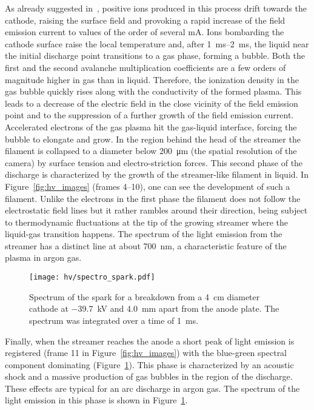 As already suggested in~\cite{breakdown_14}, positive ions produced in this process drift towards the cathode, raising the surface field and provoking a rapid increase of the field emission current to values of the order of several \si{\milli\ampere}.
Ions bombarding the cathode surface raise the local temperature and, after \SIrange{1}{2}{\milli\second}, the liquid near the initial discharge point transitions to a gas phase, forming a bubble.
Both the first and the second avalanche multiplication coefficients are a few orders of magnitude higher in gas than in liquid.
Therefore, the ionization density in the gas bubble quickly rises along with the conductivity of the formed plasma.
This leads to a decrease of the electric field in the close vicinity of the field emission point and to the suppression of a further growth of the field emission current.
Accelerated electrons of the gas plasma hit the gas-liquid interface, forcing the bubble to elongate and grow.
In the region behind the head of the streamer the filament is collapsed to a diameter below \SI{200}{\micro\metre} (the spatial resolution of the camera) by surface tension and electro-striction forces.
This second phase of the discharge is characterized by the growth of the streamer-like filament in liquid.
In Figure~\ref{fig:hv_images} (frames \numrange{4}{10}), one can see the development of such a filament.
Unlike the electrons in the first phase the filament does not follow the electrostatic field lines but it rather rambles around their direction, being subject to thermodynamic fluctuations at the tip of the growing streamer where the liquid-gas transition happens.
The spectrum of the light emission from the streamer has a distinct line at about \SI{700}{\nano\metre}, a characteristic feature of the plasma in argon gas.

\begin{figure}[htb]
	\centering
	\texttt{[image: hv/spectro\_spark.pdf]}
	\caption{Spectrum of the spark for a breakdown from a \SI{4}{\centi\metre} diameter cathode at \SI{-39.7}{\kilo\volt} and \SI{4.0}{\milli\metre} apart from the anode plate. The spectrum was integrated over a time of \SI{1}{\milli\second}.}
	\label{fig:hv_spectro_spark}
\end{figure}

Finally, when the streamer reaches the anode a short peak of light emission is registered (frame \num{11} in Figure~\ref{fig:hv_images}) with the blue-green spectral component dominating (Figure~\ref{fig:hv_spectro_spark}).
This phase is characterized by an acoustic shock and a massive production of gas bubbles in the region of the discharge.
These effects are typical for an arc discharge in argon gas.
The spectrum of the light emission in this phase  is shown in Figure~\ref{fig:hv_spectro_spark}. 

